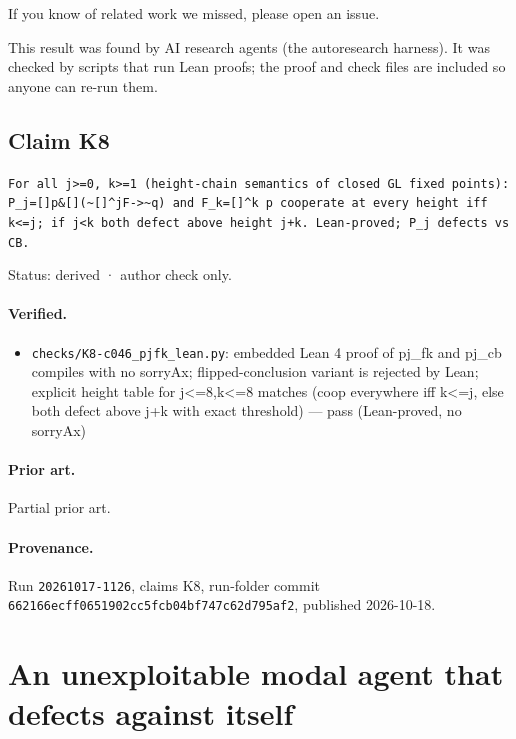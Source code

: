 \documentclass{article}
\begin{document}
If you know of related work we missed, please open an issue.

This result was found by AI research agents (the autoresearch harness). It was checked by scripts that run Lean proofs; the proof and check files are included so anyone can re-run them.

\subsection*{Claim K8}

\texttt{For all j\textgreater{}=0, k\textgreater{}=1 (height-chain semantics of closed GL fixed points): P\_j=[]p\&[](\textasciitilde{}[]\textasciicircum{}jF-\textgreater{}\textasciitilde{}q) and F\_k=[]\textasciicircum{}k p cooperate at every height iff k\textless{}=j; if j\textless{}k both defect above height j+k. Lean-proved; P\_j defects vs CB.}

Status: derived · author check only.

\paragraph{Verified.}
\begin{itemize}
\item \texttt{checks/K8-c046\_pjfk\_lean.py}: embedded Lean 4 proof of pj\_fk and pj\_cb compiles with no sorryAx; flipped-conclusion variant is rejected by Lean; explicit height table for j\textless{}=8,k\textless{}=8 matches (coop everywhere iff k\textless{}=j, else both defect above j+k with exact threshold) --- pass (Lean-proved, no sorryAx)
\end{itemize}

\paragraph{Prior art.} Partial prior art.

\paragraph{Provenance.}
Run \texttt{20261017-1126}, claims K8, run-folder commit \texttt{662166ecff0651902cc5fcb04bf747c62d795af2}, published 2026-10-18.

\section{An unexploitable modal agent that defects against itself}
\label{sec:wn-gate-family}
\end{document}
